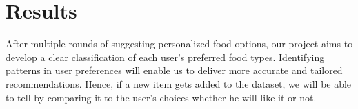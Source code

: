 \documentclass[conference]{IEEEtran}
\begin{document}
\section{Results}
After multiple rounds of suggesting personalized food options, our project aims to develop a clear classification of each user's preferred food types. Identifying patterns in user preferences will enable us to deliver more accurate and tailored recommendations. Hence, if a new item gets added to the dataset, we will be able to tell by comparing it to the user’s choices whether he will like it or not.
\end{document}
